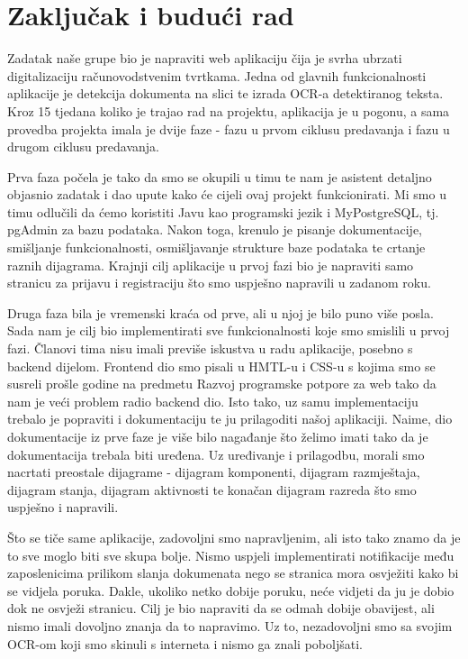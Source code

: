\chapter{Zaključak i budući rad}
		
		 
		 Zadatak naše grupe bio je napraviti web aplikaciju čija je svrha ubrzati digitalizaciju računovodstvenim tvrtkama. Jedna od glavnih funkcionalnosti aplikacije je detekcija dokumenta na slici te izrada OCR-a detektiranog teksta. Kroz 15 tjedana koliko je trajao rad na projektu, aplikacija je u pogonu, a sama provedba projekta imala je dvije faze - fazu u prvom ciklusu predavanja i fazu u drugom ciklusu predavanja.
		 
		 Prva faza počela je tako da smo se okupili u timu te nam je asistent detaljno objasnio zadatak i dao upute kako će cijeli ovaj projekt funkcionirati. Mi smo u timu odlučili da ćemo koristiti Javu kao programski jezik i MyPostgreSQL, tj. pgAdmin za bazu podataka. Nakon toga, krenulo je pisanje dokumentacije, smišljanje funkcionalnosti, osmišljavanje strukture baze podataka te crtanje raznih dijagrama. Krajnji cilj aplikacije u prvoj fazi bio je napraviti samo stranicu za prijavu i registraciju što smo uspješno napravili u zadanom roku.
		 
		 Druga faza bila je vremenski kraća od prve, ali u njoj je bilo puno više posla. Sada nam je cilj bio implementirati sve funkcionalnosti koje smo smislili u prvoj fazi. Članovi tima nisu imali previše iskustva u radu aplikacije, posebno s backend dijelom. Frontend dio smo pisali u HMTL-u i CSS-u s kojima smo se susreli prošle godine na predmetu Razvoj programske potpore za web tako da nam je veći problem radio backend dio. Isto tako, uz samu implementaciju trebalo je popraviti i dokumentaciju te ju prilagoditi našoj aplikaciji. Naime, dio dokumentacije iz prve faze je više bilo nagađanje što želimo imati tako da je dokumentacija trebala biti uređena. Uz uređivanje i prilagodbu, morali smo nacrtati preostale dijagrame - dijagram komponenti, dijagram razmještaja, dijagram stanja, dijagram aktivnosti te konačan dijagram razreda što smo uspješno i napravili.
		 
		 Što se tiče same aplikacije, zadovoljni smo napravljenim, ali isto tako znamo da je to sve moglo biti sve skupa bolje. Nismo uspjeli implementirati notifikacije među zaposlenicima prilikom slanja dokumenata nego se stranica mora osvježiti kako bi se vidjela poruka. Dakle, ukoliko netko dobije poruku, neće vidjeti da ju je dobio dok ne osvježi stranicu. Cilj je bio napraviti da se odmah dobije obavijest, ali nismo imali dovoljno znanja da to napravimo. Uz to, nezadovoljni smo sa svojim OCR-om koji smo skinuli s interneta i nismo ga znali poboljšati.
		 

